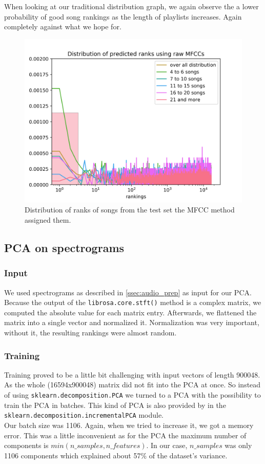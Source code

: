  When looking at our traditional distribution graph, we again observe the a lower probability of good song rankings as the length of playlists increases. Again completely against what we hope for. 
\begin{figure}[h]
    \centering
	\includegraphics[width=120mm]{./img/mfcc_graph.png}
	\caption{Distribution of ranks of songs from the test set the MFCC method assigned them.}
	\label{fig:mfcc_graph}
\end{figure}


\subsection {PCA on spectrograms}

\subsubsection{Input}
We used spectrograms as described in \ref{ssec:audio_prep} as input for our PCA. Because the output of the \texttt{librosa.core.stft()} method is a complex matrix, we computed the absolute value for each matrix entry. Afterwards, we flattened the matrix into a single vector and normalized it. Normalization was very important, without it, the resulting rankings were almost random.

\subsubsection{Training}
Training proved to be a little bit challenging with input vectors of length 900048. As the whole (16594x900048) matrix did not fit into the PCA at once. So instead of using \texttt{sklearn.decomposition.PCA} we turned to a PCA with the possibility to train the PCA in batches. This kind of PCA is also provided by  in the \texttt{sklearn.decomposition.incrementalPCA} module. \\ Our batch size was 1106. Again, when we tried to increase it, we got a memory error. This was a little inconvenient as for the PCA the maximum number of components is $min(n\_samples, n\_features)$. In our case, $n\_samples$ was only 1106 components which explained about 57\% of the dataset's variance.

